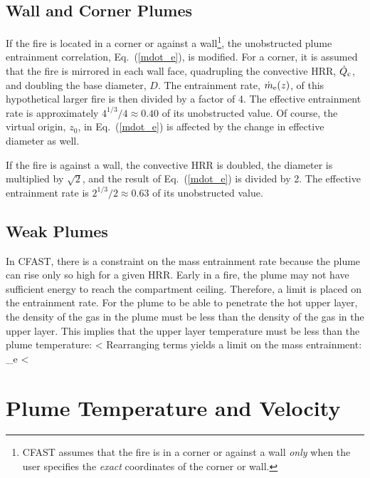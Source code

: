 \documentclass[12pt]{book}
\begin{document}
\subsection{Wall and Corner Plumes}

If the fire is located in a corner or against a wall\footnote{CFAST assumes that the fire is in a corner or against a wall {\em only} when the user specifies the {\em exact} coordinates of the corner or wall.}, the unobstructed plume entrainment correlation, Eq.~(\ref{mdot_e}), is modified. For a corner, it is assumed that the fire is mirrored in each wall face, quadrupling the convective HRR, $\dot{Q}_{\rm c}$, and doubling the base diameter, $D$. The entrainment rate, $\dot{m}_{\rm e}(z)$, of this hypothetical larger fire is then divided by a factor of 4. The effective entrainment rate is approximately $4^{1/3}/4 \approx 0.40$ of its unobstructed value. Of course, the virtual origin, $z_0$, in Eq.~(\ref{mdot_e}) is affected by the change in effective diameter as well.

If the fire is against a wall, the convective HRR is doubled, the diameter is multiplied by $\sqrt{2}$, and the result of Eq.~(\ref{mdot_e}) is divided by 2. The effective entrainment rate is $2^{1/3}/2 \approx 0.63$ of its unobstructed value.

\subsection{Weak Plumes}

In CFAST, there is a constraint on the mass entrainment rate because the plume can rise only so high for a given HRR.  Early in a fire, the plume may not have sufficient energy to reach the compartment ceiling. Therefore, a limit is placed on the entrainment rate. For the plume to be able to penetrate the hot upper layer, the density of the gas in the plume must be less than the density of the gas in the upper layer. This implies that the upper layer temperature must be less than the plume temperature:
\be
   \Tu < \Tp \approx {}
\ee
Rearranging terms yields a limit on the mass entrainment:
\be
   \dm_e < 
\ee


\section{Plume Temperature and Velocity}
\label{sec:Plume_Temp_Velocity}
\end{document}
